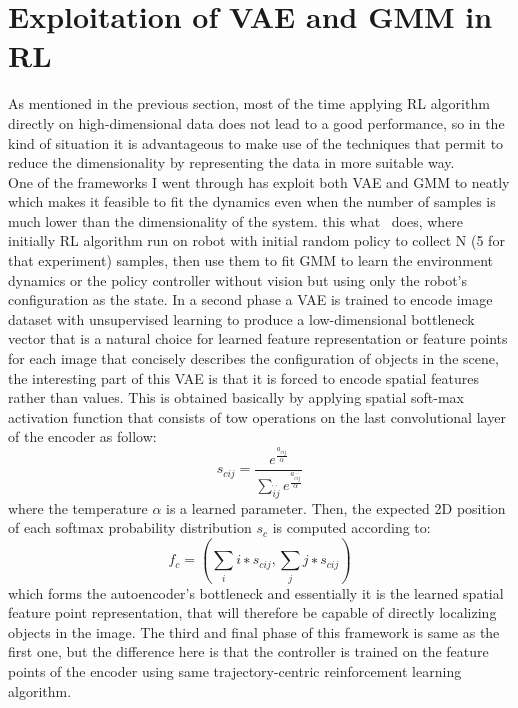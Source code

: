 \section{Exploitation of VAE and GMM in RL}
As mentioned in the previous section, most of the time applying RL algorithm directly on high-dimensional data does not lead to a good performance, so in the kind of situation it is advantageous to make use of the techniques that permit to reduce the dimensionality by representing the data in more suitable way.\\
One of the frameworks I went through has exploit both VAE and GMM to neatly which makes it feasible to fit the dynamics even when the number of samples is much lower than the dimensionality of the system. this what~\cite{finn2016deep} does, where initially RL algorithm run on robot with initial random policy to collect N (5 for that experiment) samples, then use them to fit GMM to learn the environment dynamics  or the policy controller without vision but using only the robot’s configuration as the state. In a second phase a VAE is trained to encode image dataset with unsupervised learning to produce a low-dimensional bottleneck vector that is a natural choice for learned feature representation or feature points for each image that concisely describes the configuration of objects in the scene, the interesting part of this VAE is that it is forced to encode spatial features rather than values. This is obtained  basically by applying spatial soft-max activation function that consists of tow operations on the last convolutional layer of the encoder as follow:
\begin{equation}
s_{cij} = \frac {e^{\frac{a_{cij}}{\alpha}}}
{\sum_{\acute{i}\acute{j}} e^{ \frac {a_{c \acute{i} \acute{j}}}{\alpha}}}
\end{equation}
where the temperature $\alpha$ is a learned parameter. Then, the expected
2D position of each softmax probability distribution $s_c$ is
computed according to:
\begin{equation}
f_c = (\sum_i i ∗ s_{cij} , \sum_j j ∗ s_{cij} )
\end{equation}
which forms the autoencoder's bottleneck and essentially it is the learned spatial feature point representation, that will therefore be capable of directly localizing objects in the image. The third and final phase of this framework is same as the first one, but the difference here is that the controller is trained on the feature points of the encoder using same trajectory-centric reinforcement
learning algorithm.\\
